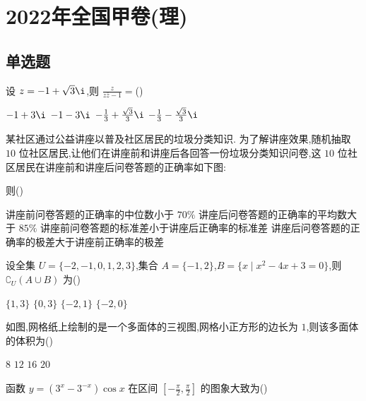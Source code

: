 
\chapter{2022年全国甲卷(理)}

\section{单选题}

\begin{problem}
设 \(z=-1+\sqrt{3}\i\),则 \(\frac{z}{z\bar z-1}=\)(\quad)

\choices
    {\(-1+3\i\)}
    {\(-1-3\i\)}
    {\(-\frac13+\frac{\sqrt3}{3}\i\)}
    {\(-\frac13-\frac{\sqrt3}{3}\i\)}
\end{problem}

\begin{problem}
某社区通过公益讲座以普及社区居民的垃圾分类知识. 为了解讲座效果,随机抽取 \(10\) 位社区居民,让他们在讲座前和讲座后各回答一份垃圾分类知识问卷,这 \(10\) 位社区居民在讲座前和讲座后问卷答题的正确率如下图:


则(\quad)

\choices
    {讲座前问卷答题的正确率的中位数小于 \(70\%\)}
    {讲座后问卷答题的正确率的平均数大于 \(85\%\)}
    {讲座前问卷答题的标准差小于讲座后正确率的标准差}
    {讲座后问卷答题的正确率的极差大于讲座前正确率的极差}
\end{problem}

\begin{problem}
设全集 \(U=\{-2,-1,0,1,2,3\}\),集合 \(A=\{-1,2\}\),\(B=\{x\mid x^2-4x+3=0\}\),则 \(\complement_U(A\cup B)\) 为(\quad)

\choices
    {\(\{1,3\}\)}
    {\(\{0,3\}\)}
    {\(\{-2,1\}\)}
    {\(\{-2,0\}\)}
\end{problem}

\begin{problem}
如图,网格纸上绘制的是一个多面体的三视图,网格小正方形的边长为 \(1\),则该多面体的体积为(\quad)


\choices
    {\(8\)}
    {\(12\)}
    {\(16\)}
    {\(20\)}
\end{problem}

\begin{problem}
函数 \(y=\left( 3^x-3^{-x} \right)\cos x\) 在区间 \(\left[ -\frac{\pi}{2},\frac{\pi}{2} \right]\) 的图象大致为(\quad)

\choices
    {}
    {}
    {}
    {}
\end{problem}

